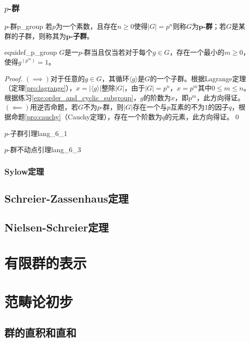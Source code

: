 \documentclass[../main.tex]{subfiles}
\begin{document}
\subsubsection{$p$-群}
\begin{definition}{$p$-群}{p_group}
若$p$为一个素数，且存在$n\geq0$使得$|G|=p^n$则称$G$为\textbf{$\mathbf{p}$-群}；若$G$是某群的子群，则称其为\textbf{$\mathbf{p}$-子群}。
\end{definition}
\begin{proposition}{}{equidef_p_group}
$G$是一$p$-群当且仅当若对于每个$g\in G$，存在一个最小的$m\geq0$，使得$g^{(p^m)}=1$。
\end{proposition}
\begin{proof}
$(\implies)$对于任意的$g\in G$，其循环$\langle g\rangle$是$G$的一个子群。根据Lagrange定理（定理\ref{pro:lagrange}），$x=|\langle g\rangle|$整除$|G|$，由于$|G|=p^n$，$x=p^m$其中$0\leq m\leq n$。根据练习\ref{exe:order_and_cyclic_subgroup}，$g$的阶数为$x$，即$p^m$，此方向得证。$(\impliedby)$用逆否命题，若$G$不为$p$-群，则$|G|$存在一个与$p$互素的不为$1$的因子$q$，根据命题\ref{pro:cauchy}（Cauchy定理），存在一个阶数为$q$的元素，此方向得证。\qed
\end{proof}
\begin{lemma}{$p$-子群引理}{lang_6_1}
\end{lemma}
\begin{lemma}{$p$-群不动点引理}{lang_6_3}
\end{lemma}
\subsubsection{Sylow定理}

\subsection{Schreier-Zassenhaus定理}
\subsection{Nielsen-Schreier定理}
\section{有限群的表示}
\section{范畴论初步}
\subsection{群的直积和直和}
\end{document}
